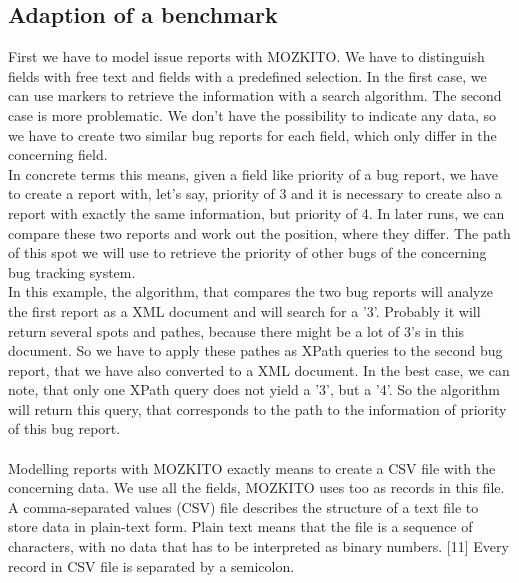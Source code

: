 \subsection{Adaption of a benchmark}
First we have to model issue reports with MOZKITO. We have to distinguish fields with free text and fields with a predefined selection. In the first case, we can use markers to retrieve the information with a search algorithm. The second case is more problematic. We don't have the possibility to indicate any data, so we have to create two similar bug reports for each field, which only differ in the concerning field. \\ In concrete terms this means, given a field like priority of a bug report, we have to create a report with, let's say, priority of 3 and it is necessary to create also a report with exactly the same information, but priority of 4. In later runs, we can compare these two reports and work out the position, where they differ. The path of this spot we will use to retrieve the priority of other bugs of the concerning bug tracking system. \\In this example, the algorithm, that compares the two bug reports will analyze the first report as a XML document and will search for a '3'. Probably it will return several spots and pathes, because there might be a lot of 3's in this document. So we have to apply these pathes as XPath queries to the second bug report, that we have also converted to a XML document. In the best case, we can note, that only one XPath query does not yield a '3', but a '4'. So the algorithm will return this query, that corresponds to the path to the information of priority of this bug report. \\ \\ Modelling reports with MOZKITO exactly means to create a CSV file with the concerning data. We use all the fields, MOZKITO uses too as records in this file. A comma-separated values (CSV) file describes the structure of a text file to store data in plain-text form. Plain text means that the file is a sequence of characters, with no data that has to be interpreted as binary numbers. [11] Every record in CSV file is separated by a semicolon. 

